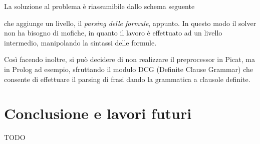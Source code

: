 \documentclass[12pt,a4paper,openright]{book} %
\begin{document}
La soluzione al problema è riassumibile dallo schema seguente
\begin{figure}[H]
\centering
{}
\end{figure}
che aggiunge un livello, il \emph{parsing delle formule}, appunto. In
questo modo il solver non ha bisogno di mofiche, in quanto il lavoro è
effettuato ad un livello intermedio, manipolando la sintassi delle
formule.

Così facendo inoltre, si può decidere di non realizzare il
preprocessor in Picat, ma in Prolog ad esempio, sfruttando il modulo
DCG \cite{MetalevelDCG} (Definite Clause Grammar) che consente di
effettuare il parsing di frasi dando la grammatica a clausole
definite.

\chapter{Conclusione e lavori futuri}
TODO
\end{document}
